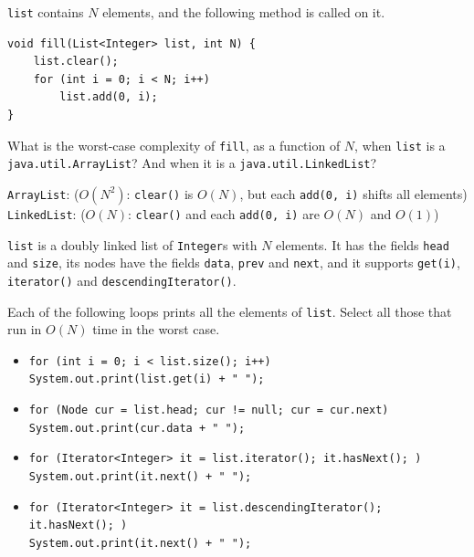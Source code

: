\begin{question}
\lstinline|list| contains $N$ elements, and the following method is called on it.

\begin{lstlisting}
void fill(List<Integer> list, int N) {
    list.clear();
    for (int i = 0; i < N; i++)
        list.add(0, i);
}
\end{lstlisting}

What is the worst-case complexity of \lstinline|fill|, as a function of $N$, when \lstinline|list| is a \lstinline|java.util.ArrayList|? And when it is a \lstinline|java.util.LinkedList|?

\lstinline|ArrayList|: \underline{\hspace{1in}} \ifanswers ($O(N^2)$: \lstinline|clear()| is $O(N)$, but each \lstinline|add(0, i)| shifts all elements)\fi \qquad
\lstinline|LinkedList|: \underline{\hspace{1in}} \ifanswers ($O(N)$: \lstinline|clear()| and each \lstinline|add(0, i)| are $O(N)$ and $O(1)$)\fi
\end{question}

\begin{question}
\lstinline|list| is a doubly linked list of \lstinline|Integer|s with $N$ elements.
It has the fields \lstinline|head| and \lstinline|size|, its nodes have the fields \lstinline|data|, \lstinline|prev| and \lstinline|next|, and it supports \lstinline|get(i)|, \lstinline|iterator()| and \lstinline|descendingIterator()|.

Each of the following loops prints all the elements of \lstinline|list|.
Select all those that run in $O(N)$ time in the worst case.

\begin{itemize}[leftmargin=2em,itemsep=4pt,topsep=2pt]
\item[\cb{0}] \lstinline|for (int i = 0; i < list.size(); i++)|\\
\hspace*{2em}\lstinline|System.out.print(list.get(i) + " ");|
\item[\cb{1}] \lstinline|for (Node cur = list.head; cur != null; cur = cur.next)|\\
\hspace*{2em}\lstinline|System.out.print(cur.data + " ");|
\item[\cb{1}] \lstinline|for (Iterator<Integer> it = list.iterator(); it.hasNext(); )|\\
\hspace*{2em}\lstinline|System.out.print(it.next() + " ");|
\item[\cb{1}] \lstinline|for (Iterator<Integer> it = list.descendingIterator(); it.hasNext(); )|\\
\hspace*{2em}\lstinline|System.out.print(it.next() + " ");|
\end{itemize}
\end{question}

